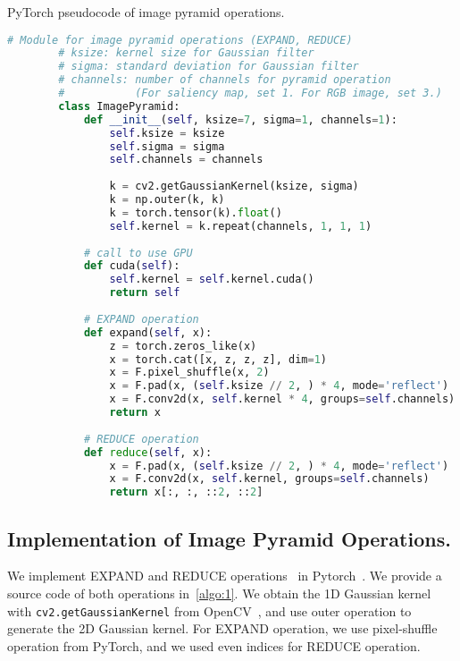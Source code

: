 \documentclass{llncs}
\begin{document}
\begin{algorithm}[tb]
    \caption{PyTorch pseudocode of image pyramid operations.}
    \label{algo:1}
       \begin{lstlisting}[language=python]
        # Module for image pyramid operations (EXPAND, REDUCE)
        # ksize: kernel size for Gaussian filter
        # sigma: standard deviation for Gaussian filter
        # channels: number of channels for pyramid operation 
        #           (For saliency map, set 1. For RGB image, set 3.)
        class ImagePyramid: 
            def __init__(self, ksize=7, sigma=1, channels=1):
                self.ksize = ksize
                self.sigma = sigma
                self.channels = channels
                
                k = cv2.getGaussianKernel(ksize, sigma)
                k = np.outer(k, k)
                k = torch.tensor(k).float()
                self.kernel = k.repeat(channels, 1, 1, 1)
            
            # call to use GPU
            def cuda(self):
                self.kernel = self.kernel.cuda()
                return self
                
            # EXPAND operation
            def expand(self, x):
                z = torch.zeros_like(x)
                x = torch.cat([x, z, z, z], dim=1)
                x = F.pixel_shuffle(x, 2)
                x = F.pad(x, (self.ksize // 2, ) * 4, mode='reflect')
                x = F.conv2d(x, self.kernel * 4, groups=self.channels)
                return x
            
            # REDUCE operation
            def reduce(self, x):
                x = F.pad(x, (self.ksize // 2, ) * 4, mode='reflect')
                x = F.conv2d(x, self.kernel, groups=self.channels)
                return x[:, :, ::2, ::2]
    \end{lstlisting}
\end{algorithm}

\subsection{Implementation of Image Pyramid Operations.}
    We implement EXPAND and REDUCE operations~\cite{burt1983laplacian} in Pytorch~\cite{paszke2019pytorch}. We provide a source code of both operations in~\cref{algo:1}.
    We obtain the 1D Gaussian kernel with \texttt{cv2.getGaussianKernel} from OpenCV~\cite{opencv_library}, and use outer operation to generate the 2D Gaussian kernel.
    For EXPAND operation, we use pixel-shuffle operation from PyTorch, and we used even indices for REDUCE operation.
\end{document}

